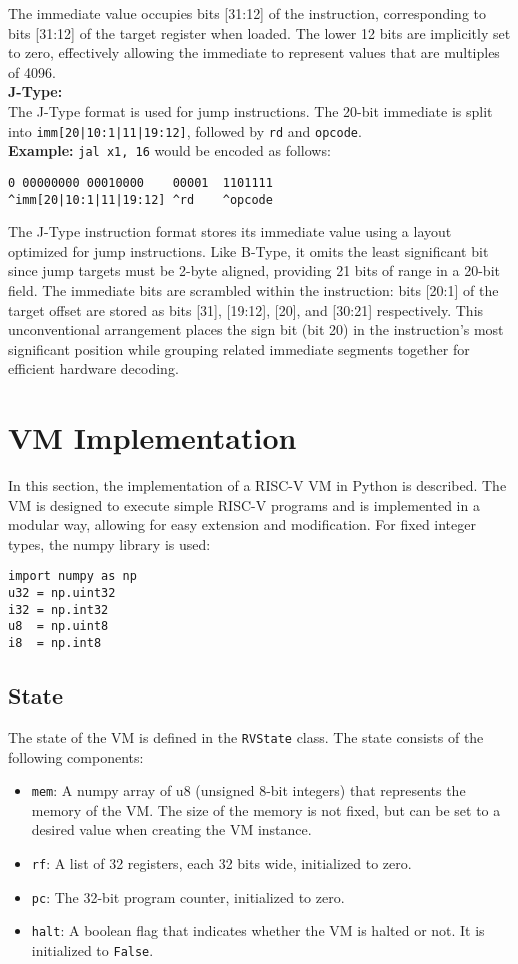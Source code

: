 \documentclass[sigconf]{acmart}
\begin{document}
The immediate value occupies bits [31:12] of the instruction, corresponding to bits [31:12] of the target register when loaded. The lower 12 bits are implicitly set to zero, effectively allowing the immediate to represent values that are multiples of 4096. \cite{riscv-spec} \\
%
\textbf{J-Type:} \\
The J-Type format is used for jump instructions. The 20-bit immediate is split into \texttt{imm[20|10:1|11|19:12]}, followed by \texttt{rd} and \texttt{opcode}. \\
\textbf{Example:} \texttt{jal x1, 16} would be encoded as follows:
\begin{verbatim}
0 00000000 00010000    00001  1101111
^imm[20|10:1|11|19:12] ^rd    ^opcode
\end{verbatim}
The J-Type instruction format stores its immediate value using a layout optimized for jump instructions. Like B-Type, it omits the least significant bit since jump targets must be 2-byte aligned, providing 21 bits of range in a 20-bit field. The immediate bits are scrambled within the instruction: bits [20:1] of the target offset are stored as bits [31], [19:12], [20], and [30:21] respectively. This unconventional arrangement places the sign bit (bit 20) in the instruction's most significant position while grouping related immediate segments together for efficient hardware decoding.
\cite{riscv-spec}

\section{VM Implementation}
In this section, the implementation of a RISC-V VM in Python is described. The VM is designed to execute simple RISC-V programs and is implemented in a modular way, allowing for easy extension and modification.
For fixed integer types, the numpy library is used:
\begin{verbatim}
import numpy as np
u32 = np.uint32
i32 = np.int32
u8  = np.uint8
i8  = np.int8
\end{verbatim}

\subsection{State}
The state of the VM is defined in the \texttt{RVState} class. The state consists of the following components:
\begin{itemize}
    \item \texttt{mem}: A numpy array of u8 (unsigned 8-bit integers) that represents the memory of the VM. The size of the memory is not fixed, but can be set to a desired value when creating the VM instance.
    \item \texttt{rf}: A list of 32 registers, each 32 bits wide, initialized to zero.
    \item \texttt{pc}: The 32-bit program counter, initialized to zero.
    \item \texttt{halt}: A boolean flag that indicates whether the VM is halted or not. It is initialized to \texttt{False}.
\end{itemize}
\end{document}
